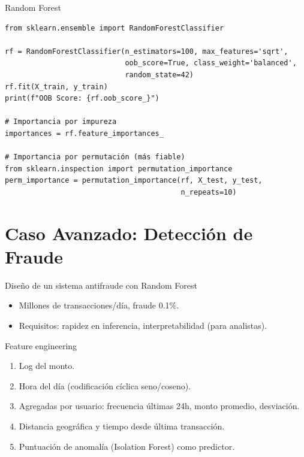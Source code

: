 \documentclass[aspectratio=169, 10pt, xcolor=table]{beamer}
\begin{document}
\begin{frame}[fragile]{Random Forest}
    \begin{lstlisting}
from sklearn.ensemble import RandomForestClassifier

rf = RandomForestClassifier(n_estimators=100, max_features='sqrt',
                            oob_score=True, class_weight='balanced',
                            random_state=42)
rf.fit(X_train, y_train)
print(f"OOB Score: {rf.oob_score_}")

# Importancia por impureza
importances = rf.feature_importances_

# Importancia por permutación (más fiable)
from sklearn.inspection import permutation_importance
perm_importance = permutation_importance(rf, X_test, y_test,
                                         n_repeats=10)
    \end{lstlisting}
\end{frame}

\section{Caso Avanzado: Detección de Fraude}

\begin{frame}{Diseño de un sistema antifraude con Random Forest}
    \begin{itemize}
        \item Millones de transacciones/día, fraude 0.1\%.
        \item Requisitos: rapidez en inferencia, interpretabilidad (para analistas).
    \end{itemize}
    \begin{block}{Feature engineering}
        \begin{enumerate}
            \item Log del monto.
            \item Hora del día (codificación cíclica seno/coseno).
            \item Agregadas por usuario: frecuencia últimas 24h, monto promedio, desviación.
            \item Distancia geográfica y tiempo desde última transacción.
            \item Puntuación de anomalía (Isolation Forest) como predictor.
        \end{enumerate}
    \end{block}
\end{frame}
\end{document}
